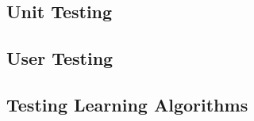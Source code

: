 %  
%

\subsection{ Unit Testing }


\subsection{ User Testing } 


\subsection{ Testing Learning Algorithms }
